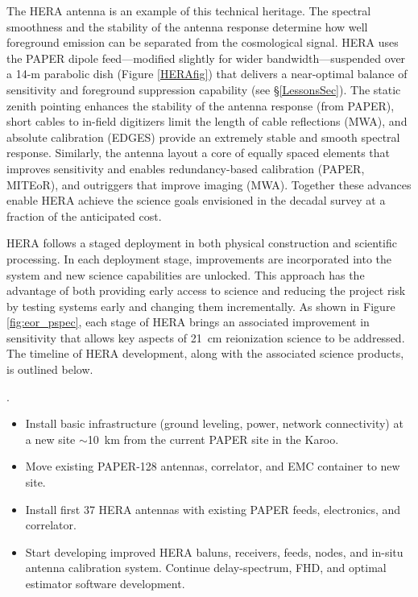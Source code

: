 \documentclass[preprint]{aastex}
\begin{document}
The HERA antenna is an example of this technical heritage. The spectral
smoothness and the stability of the antenna response determine how well
foreground emission can be separated from the cosmological signal.
HERA uses the PAPER dipole feed---modified slightly for wider
bandwidth---suspended over a 14-m parabolic dish (Figure \ref{HERAfig}) that
delivers a near-optimal balance of sensitivity and foreground suppression capability (see \S\ref{LessonsSec}).
The static zenith pointing enhances the stability of the antenna response
(from PAPER), short cables to in-field digitizers limit the length of cable
reflections (MWA), and absolute calibration (EDGES) provide
an extremely stable and smooth spectral response. Similarly, the antenna layout
a core of equally spaced elements that improves sensitivity
and enables redundancy-based calibration (PAPER, MITEoR), and 
outriggers that improve imaging (MWA).
Together
these advances enable HERA achieve the science goals envisioned in the decadal
survey at a fraction of the anticipated cost. 

HERA follows a staged deployment in both physical construction and scientific processing.  In
each deployment stage, improvements are incorporated into the system and new
science capabilities are unlocked.  This approach has the advantage of both
providing early access to science and reducing the project risk by testing systems
early and changing them incrementally.  As shown in Figure \ref{fig:eor_pspec}, each
stage of HERA brings an associated improvement in sensitivity that allows key
aspects of 21~cm reionization science to be addressed.  The timeline of HERA
development, along with the associated science products, is outlined below. 

.  
\begin{itemize}\setlength{\parskip}{0pt}\itemsep0pt
\vspace{-7pt}
  \item Install basic infrastructure (ground leveling, power, network connectivity) at a new site $\sim$10~km from 
the current PAPER site in the Karoo.
  \item Move existing PAPER-128 antennas, correlator, and EMC container to new site.
  \item Install first 37 HERA antennas with existing PAPER feeds, electronics, and correlator. 
  \item Start developing improved HERA baluns, receivers, feeds, 
nodes, and in-situ antenna calibration system.
Continue delay-spectrum, FHD, 
and optimal estimator software development.
\end{itemize}
\end{document}

